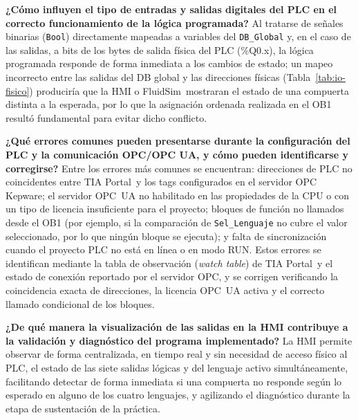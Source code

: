 \documentclass[conference]{IEEEtran}
\begin{document}
\textbf{¿Cómo influyen el tipo de entradas y salidas digitales del PLC en el correcto funcionamiento de la lógica programada?}
Al tratarse de señales binarias (\texttt{Bool}) directamente mapeadas a variables del \texttt{DB\_Global} y, en el caso de las salidas, a bits de los bytes de salida física del PLC (\%Q0.x), la lógica programada responde de forma inmediata a los cambios de estado; un mapeo incorrecto entre las salidas del DB global y las direcciones físicas (Tabla~\ref{tab:io-fisico}) produciría que la HMI o FluidSim\textregistered\ mostraran el estado de una compuerta distinta a la esperada, por lo que la asignación ordenada realizada en el OB1 resultó fundamental para evitar dicho conflicto.

\textbf{¿Qué errores comunes pueden presentarse durante la configuración del PLC y la comunicación OPC/OPC UA, y cómo pueden identificarse y corregirse?}
Entre los errores más comunes se encuentran: direcciones de PLC no coincidentes entre TIA Portal\textregistered\ y los tags configurados en el servidor OPC Kepware; el servidor OPC~UA no habilitado en las propiedades de la CPU o con un tipo de licencia insuficiente para el proyecto; bloques de función no llamados desde el OB1 (por ejemplo, si la comparación de \texttt{Sel\_Lenguaje} no cubre el valor seleccionado, por lo que ningún bloque se ejecuta); y falta de sincronización cuando el proyecto PLC no está en línea o en modo RUN. Estos errores se identifican mediante la tabla de observación (\emph{watch table}) de TIA Portal\textregistered\ y el estado de conexión reportado por el servidor OPC, y se corrigen verificando la coincidencia exacta de direcciones, la licencia OPC~UA activa y el correcto llamado condicional de los bloques.

\textbf{¿De qué manera la visualización de las salidas en la HMI contribuye a la validación y diagnóstico del programa implementado?}
La HMI permite observar de forma centralizada, en tiempo real y sin necesidad de acceso físico al PLC, el estado de las siete salidas lógicas y del lenguaje activo simultáneamente, facilitando detectar de forma inmediata si una compuerta no responde según lo esperado en alguno de los cuatro lenguajes, y agilizando el diagnóstico durante la etapa de sustentación de la práctica.
\end{document}
